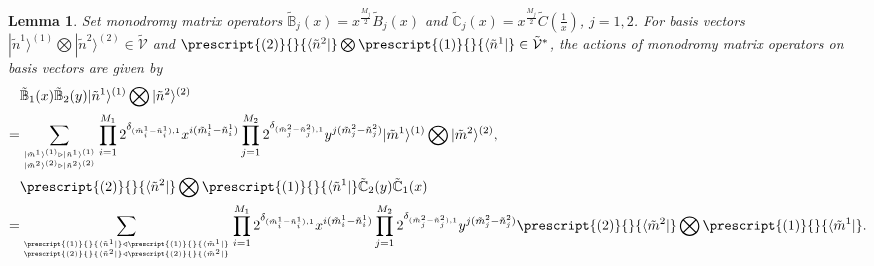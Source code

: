 \documentclass[11pt,reqno]{amsart}
\numberwithin{equation}{section}
\newtheorem{lemma}[theorem]{Lemma}
\begin{document}
	
	\begin{lemma}\label{B-n,C-n,2}
		Set monodromy matrix operators
		$\tilde{\mathbb{B}}_{j}(x) = x^{\frac{M_{j}}{2}} \tilde{B}_{j}(x)$ and $\tilde{\mathbb{C}}_{j}(x) = x^{\frac{M_{j}}{2}} \tilde{C}(\frac{1}{x})$, $j=1,2$.
		For basis vectors
		$| \tilde{n}^{1}\rangle^{(1)}\bigotimes|\tilde{n}^{2}\rangle^{(2)} \in \tilde{\mathcal{V}}$ and
		$\prescript{(2)}{}{\langle \tilde{n}^{2}|}\bigotimes \prescript{(1)}{}{\langle \tilde{n}^{1}|} \in \tilde{\mathcal{V}}^*$,
		the actions of  monodromy matrix operators on basis vectors are given by
		\begin{align}
			 &\tilde{\mathbb{B}}_{1}(x)\tilde{\mathbb{B}}_{2}(y)|\tilde{n}^{1}\rangle^{(1)}\bigotimes|\tilde{n}^{2}\rangle^{(2)} \notag\\
			=&
			\sum_{{ |\tilde{m}^{1} \rangle^{(1)} \triangleright | \tilde{n}^{1} \rangle^{(1)} }\atop{|\tilde{m}^{2} \rangle^{(2)} \triangleright | \tilde{n}^{2} \rangle^{(2)} }}
			\prod_{i=1}^{M_{1}} 2^{\delta_{(\tilde{m}^{1}_i - \tilde{n}^{1}_i), 1}}
			x^{i(\tilde{m}^{1}_i - \tilde{n}^{1}_i)}
			\prod_{j=1}^{M_{2}} 2^{\delta_{(\tilde{m}^{2}_j - \tilde{n}^{2}_j), 1}}
			y^{j(\tilde{m}^{2}_j - \tilde{n}^{2}_j)}
			| \tilde{m}^{1}\rangle^{(1)}\bigotimes|\tilde{m}^{2}\rangle^{(2)}, \label{1-B-n,C-n,2}  \\
			&\prescript{(2)}{}{\langle \tilde{n}^{2}|}\bigotimes \prescript{(1)}{}{\langle \tilde{n}^{1}|}
			\tilde{\mathbb{C}}_{2}(y)\tilde{\mathbb{C}}_{1}(x)\notag\\
			=&
			\sum_{{ \prescript{(1)}{}{\langle \tilde{n}^{1}|}
					\triangleleft
					\prescript{(1)}{}{\langle \tilde{m}^{1}|} }
				\atop{\prescript{(2)}{}{\langle \tilde{n}^{2}|}
					\triangleleft
					\prescript{(2)}{}{\langle \tilde{m}^{2}|}  }}
			\prod_{i=1}^{M_{1}} 2^{\delta_{(\tilde{m}^{1}_i - \tilde{n}^{1}_i), 1}}
			x^{i(\tilde{m}^{1}_i - \tilde{n}^{1}_i)}
			\prod_{j=1}^{M_{2}} 2^{\delta_{(\tilde{m}^{2}_j - \tilde{n}^{2}_j), 1}}
			y^{j(\tilde{m}^{2}_j - \tilde{n}^{2}_j)}
			\prescript{(2)}{}{\langle \tilde{m}^{2}|}\bigotimes \prescript{(1)}{}{\langle \tilde{m}^{1}|} .\label{2-B-n,C-n,2}
		\end{align}
	\end{lemma}
\end{document}
